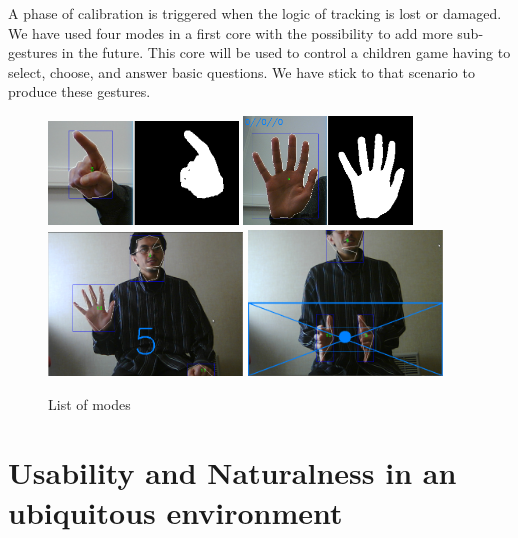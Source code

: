 \documentclass{llncs}
\begin{document}
A phase of calibration is triggered when the logic of tracking is lost or damaged.
We have used four modes in a first core with the possibility to add more sub-gestures in the future.
This core will be used to control a children game having to select, choose, and answer basic questions.
We have stick to that scenario to produce these gestures. 


\begin{figure}[!htb]
\centering
  \includegraphics[width=0.45\textwidth]{./pics/point.png}
  \includegraphics[width=0.4\textwidth]{./pics/simplify.png}
  \includegraphics[width=0.46\textwidth]{./pics/fingers.png}
  \includegraphics[width=0.46\textwidth]{./pics/move.png}
  \caption{List of modes}
\end{figure}


\section{Usability and Naturalness in an ubiquitous environment}
\end{document}
